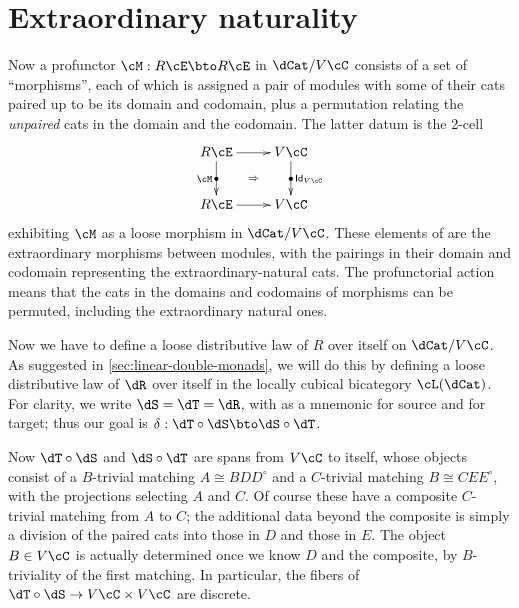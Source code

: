 \documentclass{amsart}
\let\oc\circ
\newcommand{\C}{\cC}
\newcommand{\E}{\cE}
\newcommand{\hunit}[1]{\Id_{#1}}
\newcommand{\dl}{\delta}
\renewcommand{\o}{^{\circ}}
\newcommand{\Id}{\mathsf{Id}}
\begin{document}
\section{Extraordinary naturality}
\label{sec:extranat}


Now a profunctor $\cM:R\E \bto R\E$ in $\dCat/V\C$ consists of a set of ``morphisms'', each of which is assigned a pair of modules with some of their cats paired up to be its domain and codomain, plus a permutation relating the \emph{unpaired} cats in the domain and the codomain.
The latter datum is the 2-cell
\[ \xymatrix{ R\E \ar[d]|{\bullet}_{\cM} \ar[r] \ar@{}[dr]|{\Rightarrow} & V\C \ar[d]|{\bullet}^{\hunit {V\C}} \\ R\E \ar[r] & V \C } \]
exhibiting $\cM$ as a loose morphism in $\dCat/V\C$.
These elements of \cM are the extraordinary morphisms between modules, with the pairings in their domain and codomain representing the extraordinary-natural cats.
The profunctorial action means that the cats in the domains and codomains of morphisms can be permuted, including the extraordinary natural ones.

Now we have to define a loose distributive law of $R$ over itself on $\dCat/V\C$.
As suggested in \cref{sec:linear-double-monads}, we will do this by defining a loose distributive law of $\dR$ over itself in the locally cubical bicategory $\cL(\dCat)$.
For clarity, we write $\dS=\dT=\dR$, with \dS as a mnemonic for source and \dT for target; thus our goal is $\dl : \dT \oc \dS \bto \dS \oc \dT$.

Now $\dT\oc \dS$ and $\dS\oc \dT$ are spans from $V\C$ to itself, whose objects consist of a $B$-trivial matching $A\cong B D D\o$ and a $C$-trivial matching $B \cong C E E\o$, with the projections selecting $A$ and $C$.
Of course these have a composite $C$-trivial matching from $A$ to $C$; the additional data beyond the composite is simply a division of the paired cats into those in $D$ and those in $E$.
The object $B\in V\C$ is actually determined once we know $D$ and the composite, by $B$-triviality of the first matching.
In particular, the fibers of $\dT\oc \dS \to V\C \times V\C$ are discrete.
\end{document}
